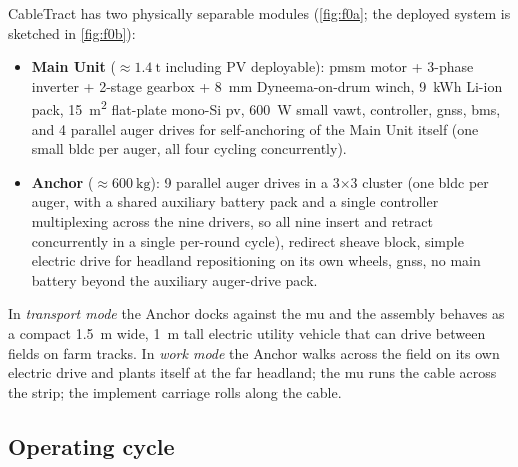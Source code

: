 \documentclass[11pt,a4paper]{article}
\begin{document}
CableTract has two physically separable modules (\cref{fig:f0a}; the deployed system is sketched in \cref{fig:f0b}):

\begin{itemize}[leftmargin=1.6em,itemsep=0.15em]
    \item \textbf{Main Unit} (${\approx}\SI{1.4}{\tonne}$ including PV deployable): \gls{pmsm} motor + 3-phase inverter + 2-stage gearbox + \SI{8}{\milli\meter} Dyneema-on-drum winch, \SI{9}{\kWh} Li-ion pack, \SI{15}{\meter\squared} flat-plate mono-Si \gls{pv}, \SI{600}{\watt} small \gls{vawt}, controller, \gls{gnss}, \gls{bms}, and 4 parallel auger drives for self-anchoring of the Main Unit itself (one small \gls{bldc} per auger, all four cycling concurrently).
    \item \textbf{Anchor} (${\approx}\SI{600}{\kilogram}$): 9 parallel auger drives in a 3$\times$3 cluster (one \gls{bldc} per auger, with a shared auxiliary battery pack and a single controller multiplexing across the nine drivers, so all nine insert and retract concurrently in a single per-round cycle), redirect sheave block, simple electric drive for headland repositioning on its own wheels, \gls{gnss}, no main battery beyond the auxiliary auger-drive pack.
\end{itemize}

In \emph{transport mode} the Anchor docks against the \gls{mu} and the assembly behaves as a compact \SI{1.5}{\meter} wide, \SI{1}{\meter} tall electric utility vehicle that can drive between fields on farm tracks. In \emph{work mode} the Anchor walks across the field on its own electric drive and plants itself at the far headland; the \gls{mu} runs the cable across the strip; the implement carriage rolls along the cable.

\subsection{Operating cycle}\label{sec:cycle}
\end{document}
